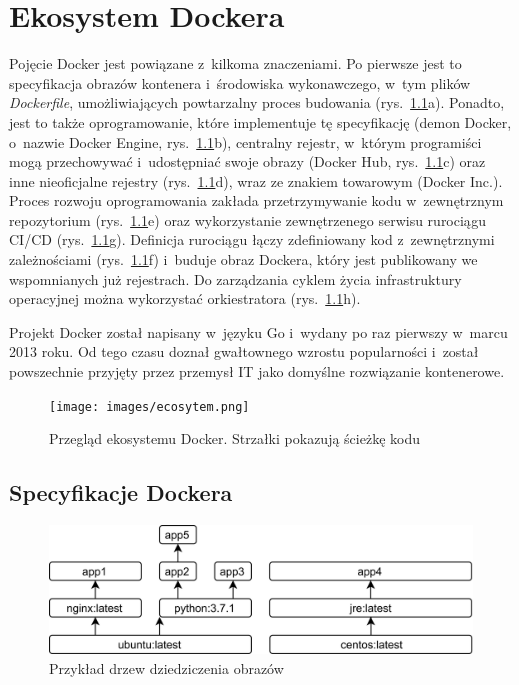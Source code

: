 \chapter{Ekosystem Dockera}

Pojęcie Docker jest powiązane z~kilkoma znaczeniami. Po pierwsze jest to specyfikacja obrazów kontenera i~środowiska wykonawczego, w~tym plików \textit{Dockerfile}, umożliwiających powtarzalny proces budowania (rys.~\ref{fig:ecosystem}a). Ponadto, jest to także oprogramowanie, które implementuje tę specyfikację (demon Docker, o~nazwie Docker Engine, rys.~\ref{fig:ecosystem}b), centralny rejestr, w~którym programiści mogą przechowywać i~udostępniać swoje obrazy (Docker Hub, rys.~\ref{fig:ecosystem}c) oraz inne nieoficjalne rejestry (rys.~\ref{fig:ecosystem}d), wraz ze znakiem towarowym (Docker Inc.). Proces rozwoju oprogramowania zakłada przetrzymywanie kodu w~zewnętrznym repozytorium (rys.~\ref{fig:ecosystem}e) oraz wykorzystanie zewnętrzenego serwisu rurociągu CI/CD (rys.~\ref{fig:ecosystem}g). Definicja rurociągu łączy zdefiniowany kod z~zewnętrznymi zależnościami (rys.~\ref{fig:ecosystem}f) i~buduje obraz Dockera, który jest publikowany we wspomnianych już rejestrach. Do zarządzania cyklem życia infrastruktury operacyjnej można wykorzystać orkiestratora (rys.~\ref{fig:ecosystem}h).

Projekt Docker został napisany w~języku Go i~wydany po raz pierwszy w~marcu 2013 roku. Od tego czasu doznał gwałtownego wzrostu popularności i~został powszechnie przyjęty przez przemysł IT jako domyślne rozwiązanie kontenerowe.

\begin{figure}[p]
    \centering
    \texttt{[image: images/ecosytem.png]}
    \caption{Przegląd ekosystemu Docker. Strzałki pokazują ścieżkę kodu}
    \label{fig:ecosystem}
\end{figure}

\section{Specyfikacje Dockera}

\begin{figure}[ht]
    \centering
    \includegraphics[width=0.9\linewidth]{images/inheritanceTree.png}
    \caption{Przykład drzew dziedziczenia obrazów}
    \label{fig:inheritanceTree}
\end{figure}

